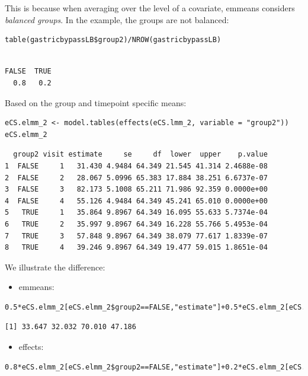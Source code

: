 \documentclass[12pt]{article}
\begin{document}
This is because when averaging over the level of a covariate, emmeans
considers \emph{balanced groups}. In the example, the groups are not
balanced:
\lstset{language=r,label= ,caption= ,captionpos=b,numbers=none}
\begin{lstlisting}
table(gastricbypassLB$group2)/NROW(gastricbypassLB)
\end{lstlisting}

\begin{verbatim}

FALSE  TRUE 
  0.8   0.2
\end{verbatim}


Based on the group and timepoint specific means:
\lstset{language=r,label= ,caption= ,captionpos=b,numbers=none}
\begin{lstlisting}
eCS.elmm_2 <- model.tables(effects(eCS.lmm_2, variable = "group2"))
eCS.elmm_2
\end{lstlisting}

\begin{verbatim}
  group2 visit estimate     se     df  lower  upper    p.value
1  FALSE     1   31.430 4.9484 64.349 21.545 41.314 2.4688e-08
2  FALSE     2   28.067 5.0996 65.383 17.884 38.251 6.6737e-07
3  FALSE     3   82.173 5.1008 65.211 71.986 92.359 0.0000e+00
4  FALSE     4   55.126 4.9484 64.349 45.241 65.010 0.0000e+00
5   TRUE     1   35.864 9.8967 64.349 16.095 55.633 5.7374e-04
6   TRUE     2   35.997 9.8967 64.349 16.228 55.766 5.4953e-04
7   TRUE     3   57.848 9.8967 64.349 38.079 77.617 1.8339e-07
8   TRUE     4   39.246 9.8967 64.349 19.477 59.015 1.8651e-04
\end{verbatim}


We illustrate the difference:
\begin{itemize}
\item emmeans:
\end{itemize}
\lstset{language=r,label= ,caption= ,captionpos=b,numbers=none}
\begin{lstlisting}
0.5*eCS.elmm_2[eCS.elmm_2$group2==FALSE,"estimate"]+0.5*eCS.elmm_2[eCS.elmm_2$group2==TRUE,"estimate"]
\end{lstlisting}

\begin{verbatim}
[1] 33.647 32.032 70.010 47.186
\end{verbatim}


\begin{itemize}
\item effects:
\end{itemize}
\lstset{language=r,label= ,caption= ,captionpos=b,numbers=none}
\begin{lstlisting}
0.8*eCS.elmm_2[eCS.elmm_2$group2==FALSE,"estimate"]+0.2*eCS.elmm_2[eCS.elmm_2$group2==TRUE,"estimate"]
\end{lstlisting}
\end{document}
